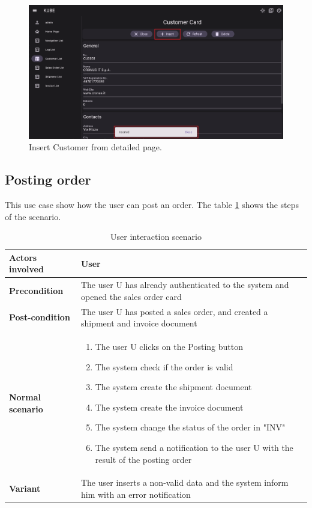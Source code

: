 \begin{figure}
    \centering
    \includegraphics[scale=0.4]{Pictures/5_customer2.png}
    \caption{Insert Customer from detailed page.}
    \label{fig:5_customer_2}
\end{figure}

\newpage

\subsection{Posting order}
This use case show how the user can post an order. The table \ref{tab:5_posting_order} shows the
steps of the scenario.

\begin{table}
    \centering
    \begin{tabular}{|l|p{10cm}|}
        \hline
        \textbf{Actors involved} & User                                                                                   \\
        \hline
        \textbf{Precondition}    & The user U has already authenticated to the system and opened the sales order card     \\
        \hline
        \textbf{Post-condition}  & The user U has posted a sales order, and created a shipment and invoice document       \\
        \hline
        \textbf{Normal scenario} &
        \begin{enumerate}
            \item The user U clicks on the Posting button
            \item The system check if the order is valid
            \item The system create the shipment document
            \item The system create the invoice document
            \item The system change the status of the order in "INV"
            \item The system send a notification to the user U with the result of the posting order
        \end{enumerate}                            \\
        \hline
        \textbf{Variant}         & The user inserts a non-valid data and the system inform him with an error notification \\
        \hline
    \end{tabular}
    \caption{User interaction scenario}
    \label{tab:5_posting_order}
\end{table}


